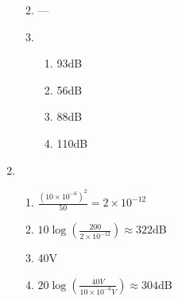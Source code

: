 \documentclass{article}
\begin{document}
\begin{enumerate}
\begin{enumerate}
\begin{enumerate}
        \end{enumerate}
      \item ---
      \item
        \begin{enumerate}
          \item 93dB
          \item 56dB
          \item 88dB
          \item 110dB
        \end{enumerate}
    \end{enumerate}
  \item 
    \begin{enumerate}
      \item $\frac{(10\times10^{-6})^2}{50} = 2\times10^{-12}$
      \item $10 \log (\frac{200}{2 \times 10^{-12}}) \approx 322$dB
      \item 40V
      \item $20 \log(\frac{40V}{10 \times 10^{-6}V}) \approx 304$dB
    \end{enumerate}
\end{enumerate}
\end{document}
